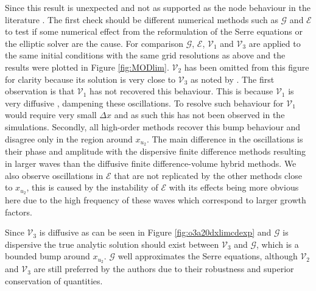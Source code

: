 \documentclass[SingleSpace,12pt,Proceedings]{Serre_ASCE}
\begin{document}
Since this result is unexpected and not as supported as the node behaviour in the literature \cite{El-etal-2006}. The first check should be different numerical methods such as $\mathcal{G}$ and $\mathcal{E}$ to test if some numerical effect from the reformulation of the Serre equations or the elliptic solver are the cause. For comparison $\mathcal{G}$, $\mathcal{E}$, $\mathcal{V}_1$ and $\mathcal{V}_3$ are applied to the same initial conditions with the same grid resolutions as above and the results were plotted in Figure \ref{fig:MODlim}. $\mathcal{V}_2$ has been omitted from this figure for clarity because its solution is very close to $\mathcal{V}_3$ as noted by . The first observation is that $\mathcal{V}_1$ has not recovered this behaviour. This is because $\mathcal{V}_1$ is very diffusive \cite{Zoppou-etal-2017}, dampening these oscillations. To resolve such behaviour for $\mathcal{V}_1$ would require very small $\Delta x$ and as such this has not been observed in the simulations. Secondly, all high-order methods recover this bump behaviour and disagree only in the region around $x_{u_2}$. The main difference in the oscillations is their phase and amplitude with the dispersive finite difference methods resulting in larger waves than the diffusive finite difference-volume hybrid methods. We also observe oscillations in $\mathcal{E}$ that are not replicated by the other methods close to $x_{u_2}$, this is caused by the instability of $\mathcal{E}$ with its effects being more obvious here due to the high frequency of these waves which correspond to larger growth factors. 

Since $\mathcal{V}_3$ is diffusive as can be seen in Figure \ref{fig:o3a20dxlimcdexp} and $\mathcal{G}$ is dispersive the true analytic solution should exist between $\mathcal{V}_3$ and $\mathcal{G}$, which is a bounded bump around $x_{u_2}$. $\mathcal{G}$ well approximates the Serre equations, although $\mathcal{V}_2$ and $\mathcal{V}_3$ are still preferred by the authors due to their robustness and superior conservation of quantities. 
\end{document}
